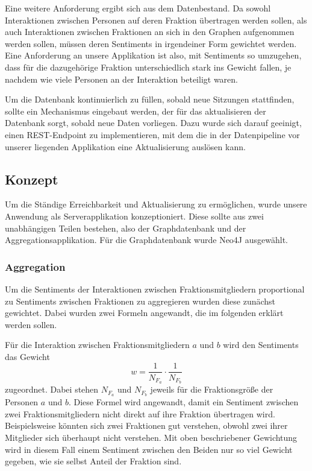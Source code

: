 Eine weitere Anforderung ergibt sich aus dem Datenbestand. Da sowohl Interaktionen zwischen Personen auf deren Fraktion übertragen werden sollen, als auch Interaktionen zwischen Fraktionen an sich in den Graphen aufgenommen werden sollen, müssen deren Sentiments in irgendeiner Form gewichtet werden. Eine Anforderung an unsere Applikation ist also, mit Sentiments so umzugehen, dass für die dazugehörige Fraktion unterschiedlich stark ins Gewicht fallen, je nachdem wie viele Personen an der Interaktion beteiligt waren.

Um die Datenbank kontinuierlich zu füllen, sobald neue Sitzungen stattfinden, sollte ein Mechanismus eingebaut werden, der für das aktualisieren der Datenbank sorgt, sobald neue Daten vorliegen. Dazu wurde sich darauf geeinigt, einen REST-Endpoint zu implementieren, mit dem die in der Datenpipeline vor unserer liegenden Applikation eine Aktualisierung auslösen kann.

\subsection{Konzept}
Um die Ständige Erreichbarkeit und Aktualisierung zu ermöglichen, wurde unsere Anwendung als Serverapplikation konzeptioniert. Diese sollte aus zwei unabhängigen Teilen bestehen, also der Graphdatenbank und der Aggregationsapplikation. Für die Graphdatenbank wurde Neo4J ausgewählt.

\subsubsection{Aggregation}
Um die Sentiments der Interaktionen zwischen Fraktionsmitgliedern proportional zu Sentiments zwischen Fraktionen zu aggregieren wurden diese zunächst gewichtet. Dabei wurden zwei Formeln angewandt, die im folgenden erklärt werden sollen.

Für die Interaktion zwischen Fraktionsmitgliedern $a$ und $b$ wird den Sentiments das Gewicht 
$$w=\frac{1}{N_{F_a}} \cdot \frac{1}{N_{F_b}}$$
zugeordnet. Dabei stehen $N_{F_a}$ und $N_{F_b}$ jeweils für die Fraktionsgröße der Personen $a$ und $b$. Diese Formel wird angewandt, damit ein Sentiment zwischen zwei Fraktionsmitgliedern nicht direkt auf ihre Fraktion übertragen wird. Beispielsweise könnten sich zwei Fraktionen gut verstehen, obwohl zwei ihrer Mitglieder sich überhaupt nicht verstehen. Mit oben beschriebener Gewichtung wird in diesem Fall einem Sentiment zwischen den Beiden nur so viel Gewicht gegeben, wie sie selbst Anteil der Fraktion sind.

